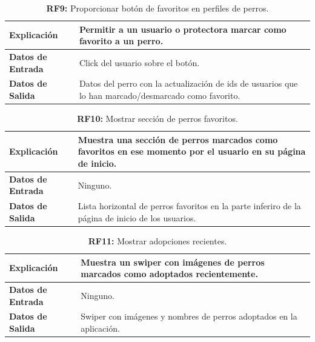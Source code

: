\documentclass[a4paper, 12pt]{article}
\begin{document}
\begin{table}[H]
\captionsetup{justification=raggedright,singlelinecheck=false}
\caption{\textbf{RF9:} Proporcionar botón de favoritos en perfiles de perros.}
\label{tab:RF9}
	\begin{tabular}{|m{5cm}|m{10cm}|}
	\hline
	\textbf{Explicación} & Permitir a un usuario o protectora marcar como favorito a un perro. \\ 
	\hline
	\textbf{Datos de Entrada} & Click del usuario sobre el botón. \\ 
	\hline
	\textbf{Datos de Salida} & Datos del perro con la actualización de ids de usuarios que lo han marcado/desmarcado como favorito.\\ 
	\hline
\end{tabular}
\end{table}

\begin{table}[H]
\captionsetup{justification=raggedright,singlelinecheck=false}
\caption{\textbf{RF10:} Mostrar sección de perros favoritos. }
\label{tab:RF10}
	\begin{tabular}{|m{5cm}|m{10cm}|}
	\hline
	\textbf{Explicación} & Muestra una sección de perros marcados como favoritos en ese momento por el usuario en su página de inicio. \\ 
	\hline
	\textbf{Datos de Entrada} & Ninguno. \\ 
	\hline
	\textbf{Datos de Salida} & Lista horizontal de perros favoritos en la parte inferiro de la página de inicio de los usuarios. \\ 
	\hline
\end{tabular}
\end{table}

\begin{table}[H]
\captionsetup{justification=raggedright,singlelinecheck=false}
\caption{\textbf{RF11:} Mostrar adopciones recientes.}
\label{tab:RF11}
	\begin{tabular}{|m{5cm}|m{10cm}|}
	\hline
	\textbf{Explicación} & Muestra un swiper con imágenes de perros marcados como adoptados recientemente. \\ 
	\hline
	\textbf{Datos de Entrada} & Ninguno. \\ 
	\hline
	\textbf{Datos de Salida} & Swiper con imágenes y nombres de perros adoptados en la aplicación. \\ 
	\hline
\end{tabular}
\end{table}
\end{document}
